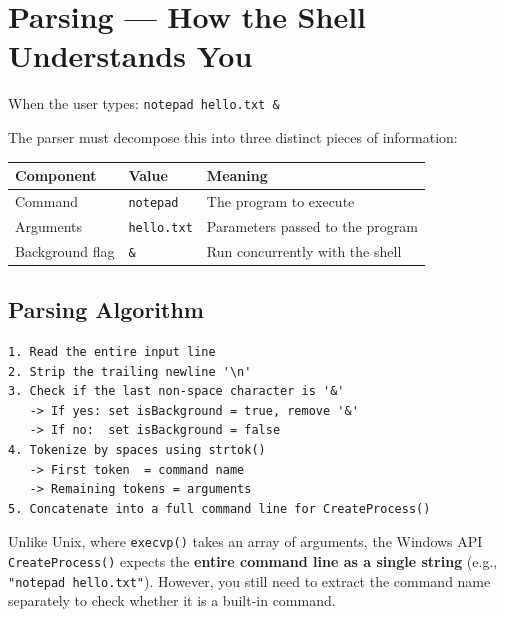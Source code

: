 \documentclass[12pt,a4paper]{article}
\begin{document}
\section{Parsing --- How the Shell Understands You}

When the user types: \texttt{notepad hello.txt \&}

The parser must decompose this into three distinct pieces of information:

\begin{center}
\begin{tabular}{lll}
    \toprule
    \textbf{Component} & \textbf{Value} & \textbf{Meaning} \\
    \midrule
    Command & \texttt{notepad} & The program to execute \\
    Arguments & \texttt{hello.txt} & Parameters passed to the program \\
    Background flag & \texttt{\&} & Run concurrently with the shell \\
    \bottomrule
\end{tabular}
\end{center}

\subsection{Parsing Algorithm}

\begin{lstlisting}[style=pseudostyle]
1. Read the entire input line
2. Strip the trailing newline '\n'
3. Check if the last non-space character is '&'
   -> If yes: set isBackground = true, remove '&'
   -> If no:  set isBackground = false
4. Tokenize by spaces using strtok()
   -> First token  = command name
   -> Remaining tokens = arguments
5. Concatenate into a full command line for CreateProcess()
\end{lstlisting}

\begin{notebox}
    Unlike Unix, where \texttt{execvp()} takes an array of arguments, the Windows API \texttt{CreateProcess()} expects the \textbf{entire command line as a single string} (e.g., \texttt{"notepad hello.txt"}). However, you still need to extract the command name separately to check whether it is a built-in command.
\end{notebox}

\end{document}
